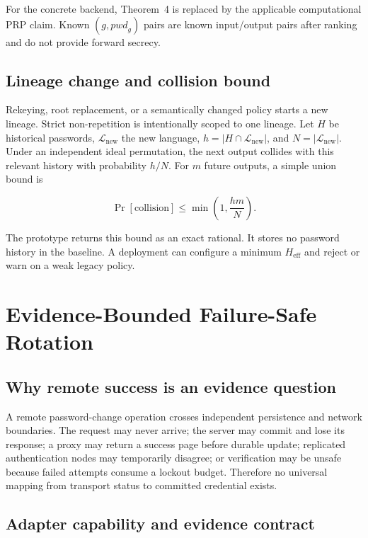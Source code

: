 \documentclass[preprint,12pt]{elsarticle}
\newcommand{\Lang}{\mathcal{L}}
\begin{document}
For the concrete backend, Theorem~4 is replaced by the applicable computational
PRP claim. Known $(g,\mathit{pwd}_g)$ pairs are known input/output pairs after
ranking and do not provide forward secrecy.

\subsection{Lineage change and collision bound}

Rekeying, root replacement, or a semantically changed policy starts a new
lineage. Strict non-repetition is intentionally scoped to one lineage. Let
$H$ be historical passwords, $\Lang_{\mathrm{new}}$ the new language,
$h=|H\cap\Lang_{\mathrm{new}}|$, and $N=|\Lang_{\mathrm{new}}|$. Under an
independent ideal permutation, the next output collides with this relevant
history with probability $h/N$. For $m$ future outputs, a simple union bound is

\[
 \Pr[\mathrm{collision}]\le \min\left(1,\frac{hm}{N}\right).
\]

The prototype returns this bound as an exact rational. It stores no password
history in the baseline. A deployment can configure a minimum
$H_{\mathrm{eff}}$ and reject or warn on a weak legacy policy.

\section{Evidence-Bounded Failure-Safe Rotation}

\subsection{Why remote success is an evidence question}

A remote password-change operation crosses independent persistence and network
boundaries. The request may never arrive; the server may commit and lose its
response; a proxy may return a success page before durable update; replicated
authentication nodes may temporarily disagree; or verification may be unsafe
because failed attempts consume a lockout budget. Therefore no universal
mapping from transport status to committed credential exists.



\subsection{Adapter capability and evidence contract}
\end{document}
